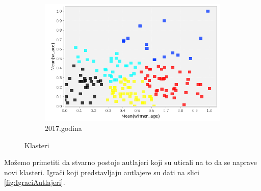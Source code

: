 \documentclass[a4paper]{article}
\begin{document}
\begin{figure}[H]
	\vspace{0.5cm}
	\begin{subfigure}[h]{\textwidth}
		\begin{center}
			\includegraphics[scale=0.40]{Klasterovanje/ScatterPlot_KMeans2017.png}
		\end{center}
		\caption{2017.godina}
		\label{KNIME_ScatterPlot2017}
	\end{subfigure}
	
	\caption{Klasteri}
	\label{KlasteriScatterPlot}
\end{figure}

Možemo primetiti da stvarno postoje autlajeri koji su uticali na to da se naprave novi klasteri. Igrači koji predstavljaju autlajere su dati na slici \ref{fig:IgraciAutlajeri}. 
\end{document}
